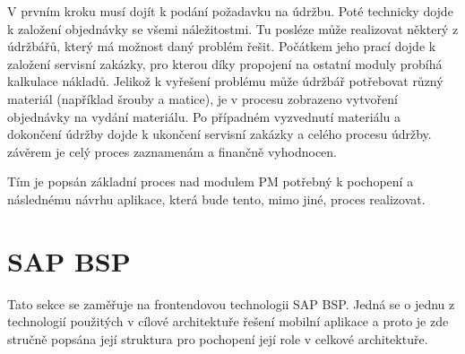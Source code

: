 \documentclass[thesis=M,czech]{FITthesis}[2012/06/26]
\begin{document}
V prvním kroku musí dojít k podání požadavku na údržbu. Poté technicky dojde k založení objednávky se všemi náležitostmi. Tu posléze může realizovat některý z údržbářů, který má možnost daný problém řešit. Počátkem jeho prací dojde k založení servisní zakázky, pro kterou díky propojení na ostatní moduly probíhá kalkulace nákladů. Jelikož k vyřešení problému může údržbář potřebovat různý materiál (například šrouby a matice), je v procesu zobrazeno vytvoření objednávky na vydání materiálu. Po případném vyzvednutí materiálu a dokončení údržby dojde k ukončení servisní zakázky a celého procesu údržby. závěrem je celý proces zaznamenám a finančně vyhodnocen.

Tím je popsán základní proces nad modulem PM potřebný k pochopení a následnému návrhu aplikace, která bude tento, mimo jiné, proces realizovat.

\section{SAP BSP}
\label{sec:bsp}
Tato sekce se zaměřuje na frontendovou technologii SAP BSP. Jedná se o jednu z technologií použitých v cílové architektuře řešení mobilní aplikace a proto je zde stručně popsána její struktura pro pochopení její role v celkové architektuře. 
\end{document}
